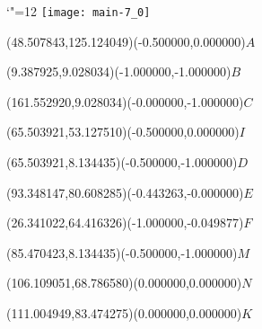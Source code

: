 \documentclass[12pt]{article}
\begin{document}
\makeatletter%
\let\ASYencoding\f@encoding%
\let\ASYfamily\f@family%
\let\ASYseries\f@series%
\let\ASYshape\f@shape%
\makeatother%
{\catcode`"=12%
\texttt{[image: main-7\_0]}%
}%
\kern -170.716535pt%
%
%
\fontsize{10.000000}{12.000000}\selectfont%
\usefont{\ASYencoding}{\ASYfamily}{\ASYseries}{\ASYshape}%
\ASYalign(48.507843,125.124049)(-0.500000,0.000000){$A$}%
%
%
\fontsize{10.000000}{12.000000}\selectfont%
\ASYalign(9.387925,9.028034)(-1.000000,-1.000000){$B$}%
%
%
\fontsize{10.000000}{12.000000}\selectfont%
\ASYalign(161.552920,9.028034)(-0.000000,-1.000000){$C$}%
%
%
\fontsize{10.000000}{12.000000}\selectfont%
\ASYalign(65.503921,53.127510)(-0.500000,0.000000){$I$}%
%
%
\fontsize{10.000000}{12.000000}\selectfont%
\ASYalign(65.503921,8.134435)(-0.500000,-1.000000){$D$}%
%
%
\fontsize{10.000000}{12.000000}\selectfont%
\ASYalign(93.348147,80.608285)(-0.443263,-0.000000){$E$}%
%
%
\fontsize{10.000000}{12.000000}\selectfont%
\ASYalign(26.341022,64.416326)(-1.000000,-0.049877){$F$}%
%
%
\fontsize{10.000000}{12.000000}\selectfont%
\ASYalign(85.470423,8.134435)(-0.500000,-1.000000){$M$}%
%
%
\fontsize{10.000000}{12.000000}\selectfont%
\ASYalign(106.109051,68.786580)(0.000000,0.000000){$N$}%
%
%
\fontsize{10.000000}{12.000000}\selectfont%
\ASYalign(111.004949,83.474275)(0.000000,0.000000){$K$}%
\end{document}
